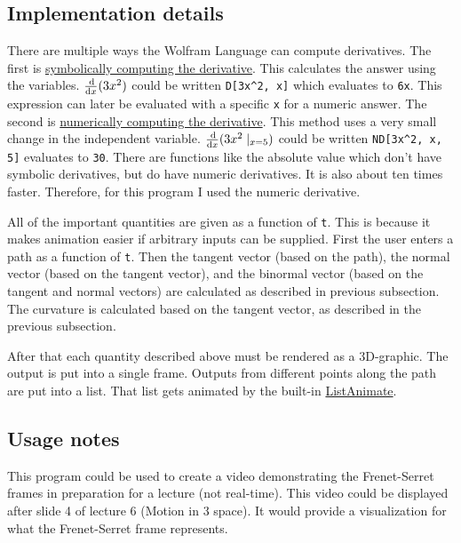 \subsection*{Implementation details}

There are multiple ways the Wolfram Language can compute derivatives. The first is \href{https://reference.wolfram.com/language/ref/D.html}{symbolically computing the derivative}. This calculates the answer using the variables. \(\frac{\dif}{\dif x}(3x^2)\) could be written \verb+D[3x^2, x]+ which evaluates to \verb+6x+. This expression can later be evaluated with a specific \verb+x+ for a numeric answer. The second is \href{http://reference.wolfram.com/language/NumericalCalculus/ref/ND.html}{numerically computing the derivative}. This method uses a very small change in the independent variable. \(\frac{\dif}{\dif x}(3x^2\mid_{x=5})\) could be written \verb+ND[3x^2, x, 5]+ evaluates to \verb+30+. There are functions like the absolute value which don't have symbolic derivatives, but do have numeric derivatives. It is also about ten times faster. Therefore, for this program I used the numeric derivative.

All of the important quantities are given as a function of \verb+t+. This is because it makes animation easier if arbitrary inputs can be supplied. First the user enters a path as a function of \verb+t+. Then the tangent vector (based on the path), the normal vector (based on the tangent vector), and the binormal vector (based on the tangent and normal vectors) are calculated as described in previous subsection. The curvature is calculated based on the tangent vector, as described in the previous subsection.

After that each quantity described above must be rendered as a 3D-graphic. The output is put into a single frame. Outputs from different points along the path are put into a list. That list gets animated by the built-in \href{https://reference.wolfram.com/language/ref/ListAnimate.html}{ListAnimate}.

\subsection*{Usage notes}

This program could be used to create a video demonstrating the Frenet-Serret frames in preparation for a lecture (not real-time). This video could be displayed after slide 4 of lecture 6 (Motion in 3 space). It would provide a visualization for what the Frenet-Serret frame represents.

